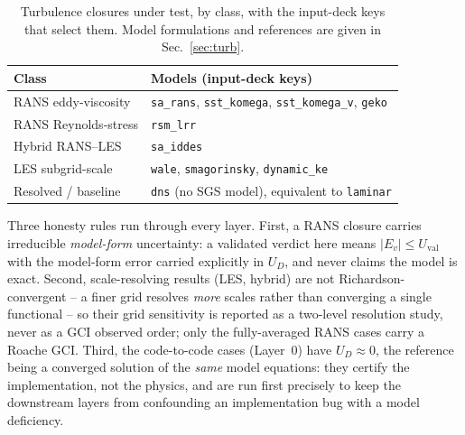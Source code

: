 \documentclass[journal,biblatex]{new-aiaa}
\newcommand{\Field}[1]{\texttt{#1}}
\begin{document}
\begin{table}[H]
\centering\footnotesize\setlength{\tabcolsep}{6pt}
\caption{Turbulence closures under test, by class, with the input-deck keys
that select them. Model formulations and references are given in
Sec.~\ref{sec:turb}.}
\label{tab:val-turbulent-models}
\begin{tabular}{@{}ll@{}}
\toprule
Class & Models (input-deck keys) \\
\midrule
RANS eddy-viscosity & \Field{sa\_rans}, \Field{sst\_komega}, \Field{sst\_komega\_v}, \Field{geko} \\
RANS Reynolds-stress & \Field{rsm\_lrr} \\
Hybrid RANS--LES & \Field{sa\_iddes} \\
LES subgrid-scale & \Field{wale}, \Field{smagorinsky}, \Field{dynamic\_ke} \\
Resolved / baseline & \Field{dns} (no SGS model), equivalent to \Field{laminar} \\
\bottomrule
\end{tabular}
\end{table}

Three honesty rules run through every layer. First, a RANS closure carries irreducible \emph{model-form} uncertainty: a validated verdict here means $|E_v|\le U_{\mathrm{val}}$ with the model-form error carried explicitly in $U_D$, and never claims the model is exact. Second, scale-resolving results (LES, hybrid) are not Richardson-convergent -- a finer grid resolves \emph{more} scales rather than converging a single functional -- so their grid sensitivity is reported as a two-level resolution study, never as a GCI observed order; only the fully-averaged RANS cases carry a Roache GCI. Third, the code-to-code cases (Layer~0) have $U_D\approx0$, the reference being a converged solution of the \emph{same} model equations: they certify the implementation, not the physics, and are run first precisely to keep the downstream layers from confounding an implementation bug with a model deficiency.
\end{document}
